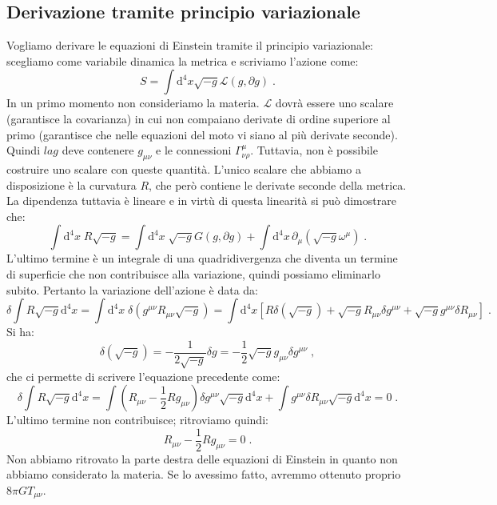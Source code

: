 \documentclass[12pt,a4paper]{report}
\theoremstyle{definition}
\newcommand{\lag}{\mathcal{L}}
\newcommand{\diff}[1][]{\mathrm{d}#1}
\newcommand{\conn}[3]{\Gamma^{#1}_{#2 #3}}
\begin{document}
\subsection{Derivazione tramite principio variazionale}
Vogliamo derivare le equazioni di Einstein tramite il principio variazionale: scegliamo come variabile dinamica la metrica e scriviamo l'azione come:
$$
S=\int\diff^4{x}\sqrt{-g}\lag(g,\partial g)\;.
$$
In un primo momento non consideriamo la materia. $\lag$ dovrà essere uno scalare (garantisce la covarianza) in cui non compaiano derivate di ordine superiore al primo (garantisce che nelle equazioni del moto vi siano al più derivate seconde). Quindi $lag$ deve contenere $g_{\mu\nu}$ e le connessioni $\conn{\mu}{\nu}{\rho}$. Tuttavia, non è possibile costruire uno scalare con queste quantità. L'unico scalare che abbiamo a disposizione è la curvatura $R$, che però contiene le derivate seconde della metrica. La dipendenza tuttavia è lineare e in virtù di questa linearità si può dimostrare che:
\begin{equation}
\int\diff^4{x}\;R\sqrt{-g}=\int \diff^4{x}\;\sqrt{-g}G(g,\partial g)+\int \diff^4{x}\,\partial_{\mu}(\sqrt{-g}\omega^{\mu})\;.
\end{equation}
L'ultimo termine è un integrale di una quadridivergenza che diventa un termine di superficie che non contribuisce alla variazione, quindi possiamo eliminarlo subito. Pertanto la variazione dell'azione è data da:
\begin{equation*}
\delta\int R\sqrt{-g}\diff^4{x}=\int\diff^4{x}\;\delta(g^{\mu\nu}R_{\mu\nu}\sqrt{-g})=\int\diff^4{x}\left[R\delta(\sqrt{-g})+\sqrt{-g}R_{\mu\nu}\delta g^{\mu\nu}+\sqrt{-g}g^{\mu\nu}\delta R_{\mu\nu}\right]\;.
\end{equation*}
Si ha:
$$
\delta(\sqrt{-g})=-\frac{1}{2\sqrt{-g}}\delta g=-\frac{1}{2}\sqrt{-g}g_{\mu\nu}\delta g^{\mu\nu}\;,
$$
che ci permette di scrivere l'equazione precedente come:
$$
\delta \int R\sqrt{-g}\diff^4{x}=\int\left(R_{\mu\nu}-\frac{1}{2}Rg_{\mu\nu}\right)\delta g^{\mu\nu}\sqrt{-g}\diff^4{x}+\int g^{\mu\nu}\delta R_{\mu\nu}\sqrt{-g}\diff^4{x}=0\;.
$$
L'ultimo termine non contribuisce; ritroviamo quindi:
$$
R_{\mu\nu}-\frac{1}{2}Rg_{\mu\nu}=0\;.
$$
Non abbiamo ritrovato la parte destra delle equazioni di Einstein in quanto non abbiamo considerato la materia. Se lo avessimo fatto, avremmo ottenuto proprio $8\pi GT_{\mu\nu}$.
\end{document}
